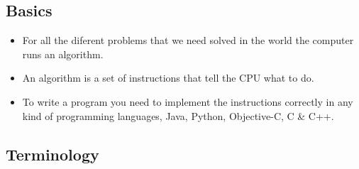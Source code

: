 \subsection{Basics}
\begin{itemize}
    \item For all the diferent problems that we need solved in the world the computer runs an algorithm.
    \item An algorithm is a set of instructions that tell the CPU what to do.
    \item To write a program you need to implement the instructions correctly in any kind of programming languages, Java, Python, Objective-C, C \& C++.
\end{itemize}
\subsection{Terminology}
